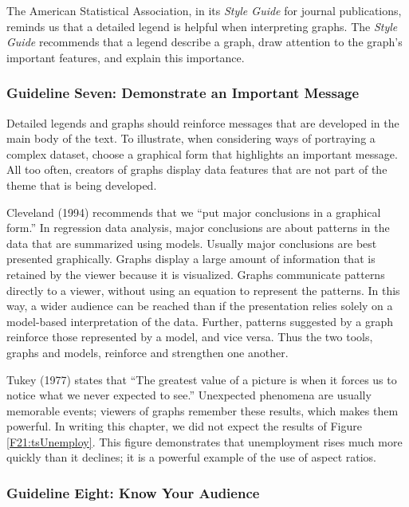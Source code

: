 The American Statistical Association, in its \emph{Style Guide} for
journal publications, reminds us that a detailed legend is helpful
when interpreting graphs. The \emph{Style Guide} recommends that a
legend describe a graph, draw attention to the graph's important
features, and explain this importance.

\subsubsection*{Guideline Seven: Demonstrate an Important Message}

Detailed legends and graphs should reinforce messages that are
developed in the main body of the text. To illustrate, when
considering ways of portraying a complex dataset, choose a graphical
form that highlights an important message. All too often, creators
of graphs display data features that are not part of the theme that
is being developed.

Cleveland (1994) recommends that we ``put major conclusions in a
graphical form.'' In regression data analysis, major conclusions are
about patterns in the data that are summarized using models. Usually
major conclusions are best presented graphically. Graphs display a
large amount of information that is retained by the viewer because
it is visualized. Graphs communicate patterns directly to a viewer,
without using an equation to represent the patterns. In this way, a
wider audience can be reached than if the presentation relies solely
on a model-based interpretation of the data. Further, patterns
suggested by a graph reinforce those represented by a model, and
vice versa. Thus the two tools, graphs and models, reinforce and
strengthen one another.


Tukey (1977) states that ``The greatest value of a picture is when
it forces us to notice what we never expected to see.'' Unexpected
phenomena are usually memorable events; viewers of graphs remember
these results, which makes them powerful. In writing this chapter,
we did not expect the results of Figure \ref{F21:tsUnemploy}. This
figure demonstrates that unemployment rises much more quickly than
it declines; it is a powerful example of the use of aspect ratios.

\subsubsection*{Guideline Eight: Know Your Audience}

